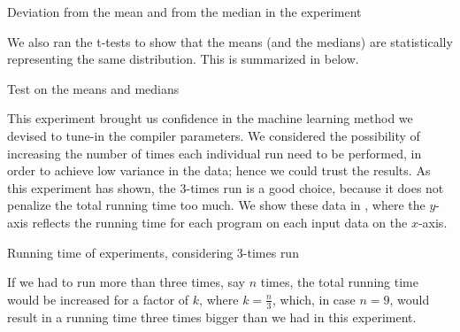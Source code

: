 \begin{table}
  \centering
  \begin{tiny}
  
  \end{tiny}
  \caption{Deviation from the mean and from the median in the experiment}
  \label{tab:simStats}
\end{table}

We also ran the t-tests to show that the means (and the medians) are statistically representing the same distribution. This is summarized in  below.

\begin{table}
  \centering
  \begin{tiny}
  
  \end{tiny}
  \caption{Test on the means and medians}
  \label{tab:statTest}
\end{table}

This experiment brought us confidence in the machine learning method we devised to tune-in the compiler parameters. We considered the possibility of increasing the number of times each individual run need to be performed, in order to achieve low variance in the data; hence we could trust the results. As this experiment has shown, the $3$-times run is a good choice, because it does not penalize the total running time too much. We show these data in , where the $y$-axis reflects the running time for each program on each input data on the $x$-axis.

\begin{table}
  \centering
  \begin{tiny}
  
  \end{tiny}
  \caption{Running time of experiments, considering $3$-times run}
  \label{tab:runTime}
\end{table}

If we had to run more than three times, say $n$ times, the total running time would be increased for a factor of $k$, where $k = \frac{n}{3}$, which, in case $n = 9$, would result in a running time three times bigger than we had in this experiment.
